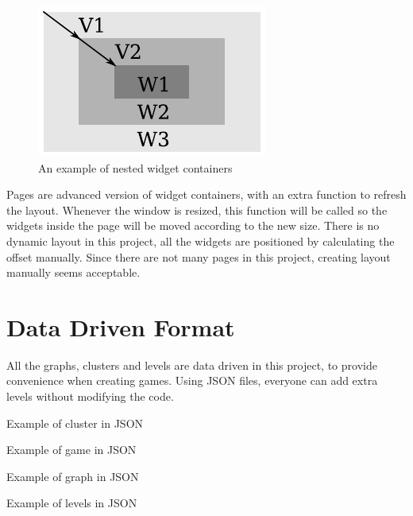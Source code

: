 \documentclass[msc,deptreport, cs]{infthesis}
\begin{document}
\begin{figure}[!htb]
  \centering
  \includegraphics[width=0.26\columnwidth]{container.pdf}
  \caption{An example of nested widget containers}
  \label{fig:container}
\end{figure}

Pages are advanced version of widget containers, with an extra function to refresh the layout. Whenever the window is resized, this function will be called so the widgets inside the page will be moved according to the new size. There is no dynamic layout in this project, all the widgets are positioned by calculating the offset manually. Since there are not many pages in this project, creating layout manually seems acceptable. 

\section{Data Driven Format} \label{sec:format}

All the graphs, clusters and levels are data driven in this project, to provide convenience when creating games. Using JSON files, everyone can add extra levels without modifying the code.

\begin{lstfloat}
  
  \caption{Example of cluster in JSON}
  \vspace{-1em}
\end{lstfloat}

\begin{lstfloat}
  
  \caption{Example of game in JSON}
  \vspace{-1em}
\end{lstfloat}

\begin{lstfloat}
  
  \caption{Example of graph in JSON}
  \vspace{-1em}
\end{lstfloat}

\begin{lstfloat}
  
  \caption{Example of levels in JSON}
  \vspace{-1em}
\end{lstfloat}
\end{document}

